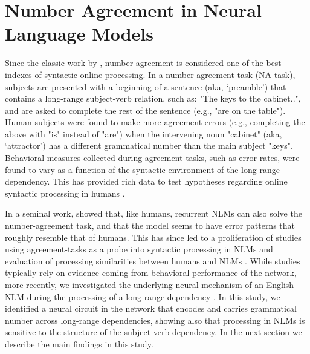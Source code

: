 \section{Number Agreement in Neural Language Models}
Since the classic work by \citet{Bock:Miller:1991}, number agreement is considered one of the best indexes of syntactic online processing. 
In a number agreement task (NA-task), subjects are presented with a beginning of a sentence (aka, `preamble') that contains a long-range subject-verb relation, such as: "The keys to the cabinet..", and are asked to complete the rest of the sentence (e.g., "are on the table"). 
Human subjects were found to make more agreement errors (e.g., completing the above with "is" instead of "are") when the intervening noun "cabinet" (aka, `attractor') has a different grammatical number than the main subject "keys". Behavioral measures collected during agreement tasks, such as error-rates, were found to vary as a function of the syntactic environment of the long-range dependency. This has provided rich data to test hypotheses regarding online syntactic processing in humans \citep[e.g., ][]{franck2002subject, franck2006agreement, franck2007syntactic}.

In a seminal work, \citet{Linzen:etal:2016} showed that, like humans, recurrent NLMs can also solve the number-agreement task, and that the model seems to have error patterns that roughly resemble that of humans.
This has since led to a proliferation of studies using agreement-tasks as a probe into syntactic processing in NLMs \citep[e.g.,][]{Gulordava:etal:2018, Kuncoro:etal:2018a, Giulianelli:etal:2018,jumelet2019analysing} and evaluation of processing similarities between humans and NLMs \citep[e.g.,][]{Linzen:Leonard:2018}. While studies typically rely on evidence coming from behavioral performance of the network, more recently, we investigated the underlying neural mechanism of an English NLM during the processing of a long-range dependency \citep{lakretz2019emergence}. In this study, we identified a neural circuit in the network that encodes and carries grammatical number across long-range dependencies, showing also that processing in NLMs is sensitive to the structure of the subject-verb dependency. In the next section we describe the main findings in this study.

